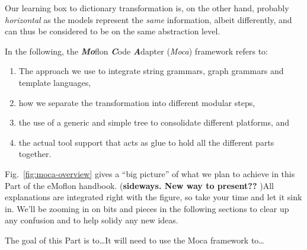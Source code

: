 Our learning box to dictionary transformation is, on the other hand, probably \emph{horizontal} as the models represent the \emph{same} information, albeit
differently, and can thus be considered to be on the same abstraction level.

\vspace{1.5cm}

In the following, the \emph{\bf Mo}flon \emph{\bf C}ode \emph{\bf A}dapter (\emph{Moca}) framework refers to:
\begin{enumerate}

 \item The approach we use to integrate string grammars, graph grammars and template languages, 

 \item how we separate the transformation into different modular steps, 

 \item the use of a generic and simple tree to consolidate different platforms, and 

 \item the actual tool support that acts as glue to hold all the different parts together.

\end{enumerate}

Fig.~\ref{fig:moca-overview} gives a ``big picture'' of what we plan to achieve in this Part of the eMoflon handbook. ({\bf sideways. New way to present?? })All
explanations are integrated right with the figure, so take your time and let it sink in. We'll be zooming in on bits and pieces in the following sections to
clear up any confusion and to help solidy any new ideas.


The goal of this Part is to\ldots It will need to use the Moca framework to\ldots
